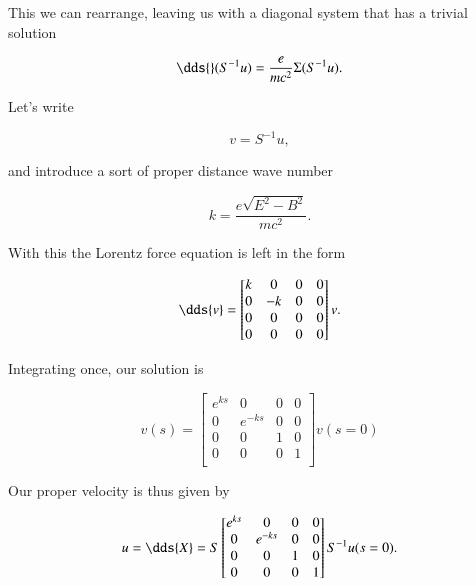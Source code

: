 This we can rearrange, leaving us with a diagonal system that has a trivial solution

\begin{equation}\label{eqn:relElectroDynProblemSet2:770}
\dds{} (S^{-1} u) = \frac{e}{m c^2} \Sigma (S^{-1} u).
\end{equation}

Let's write

\begin{equation}\label{eqn:relElectroDynProblemSet2:790}
v = S^{-1} u,
\end{equation}

and introduce a sort of proper distance wave number

\begin{equation}\label{eqn:relElectroDynProblemSet2:810}
k = \frac{e \sqrt{E^2 - B^2}}{m c^2}.
\end{equation}

With this the Lorentz force equation is left in the form

\begin{equation}\label{eqn:relElectroDynProblemSet2:830}
\dds{v} = 
\begin{bmatrix}
k & 0 & 0 & 0 \\
0 & -k & 0 & 0 \\
0 & 0 & 0 & 0 \\
0 & 0 & 0 & 0 \\
\end{bmatrix} v.
\end{equation}

Integrating once, our solution is

\begin{equation}\label{eqn:relElectroDynProblemSet2:850}
v(s) = 
\begin{bmatrix}
e^{ks} & 0 & 0 & 0 \\
0 & e^{-ks} & 0 & 0 \\
0 & 0 & 1 & 0 \\
0 & 0 & 0 & 1 \\
\end{bmatrix} v(s=0)
\end{equation}

Our proper velocity is thus given by

\begin{equation}\label{eqn:relElectroDynProblemSet2:870}
u = \dds{X} = S 
\begin{bmatrix}
e^{ks} & 0 & 0 & 0 \\
0 & e^{-ks} & 0 & 0 \\
0 & 0 & 1 & 0 \\
0 & 0 & 0 & 1 \\
\end{bmatrix} S^{-1} u(s=0).
\end{equation}

